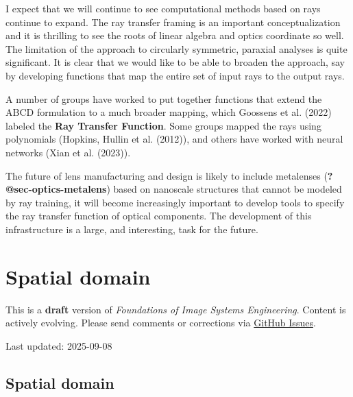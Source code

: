 \documentclass[
  letterpaper,
]{book}
\begin{document}
I expect that we will continue to see computational methods based on
rays continue to expand. The ray transfer framing is an important
conceptualization and it is thrilling to see the roots of linear algebra
and optics coordinate so well. The limitation of the approach to
circularly symmetric, paraxial analyses is quite significant. It is
clear that we would like to be able to broaden the approach, say by
developing functions that map the entire set of input rays to the output
rays.

A number of groups have worked to put together functions that extend the
ABCD formulation to a much broader mapping, which Goossens et al. (2022)
labeled the \textbf{Ray Transfer Function}. Some groups mapped the rays
using polynomials (Hopkins, Hullin et al. (2012)), and others have
worked with neural networks (Xian et al. (2023)).

The future of lens manufacturing and design is likely to include
metalenses (\textbf{?@sec-optics-metalens}) based on nanoscale
structures that cannot be modeled by ray training, it will become
increasingly important to develop tools to specify the ray transfer
function of optical components. The development of this infrastructure
is a large, and interesting, task for the future.

\chapter{Spatial domain}\label{sec-optics-linear-space}

\begin{tcolorbox}[enhanced jigsaw, colframe=quarto-callout-warning-color-frame, titlerule=0mm, rightrule=.15mm, opacitybacktitle=0.6, colback=white, leftrule=.75mm, coltitle=black, title=\textcolor{quarto-callout-warning-color}{\faExclamationTriangle}\hspace{0.5em}{Work in Progress}, bottomrule=.15mm, colbacktitle=quarto-callout-warning-color!10!white, breakable, left=2mm, bottomtitle=1mm, toptitle=1mm, opacityback=0, arc=.35mm, toprule=.15mm]

This is a \textbf{draft} version of \emph{Foundations of Image Systems
Engineering}. Content is actively evolving. Please send comments or
corrections via \href{https://github.com/wandell/FISE-git/issues}{GitHub
Issues}.

Last updated: 2025-09-08

\end{tcolorbox}

\section{Spatial domain}\label{sec-optics-linear-space-overview}
\end{document}
